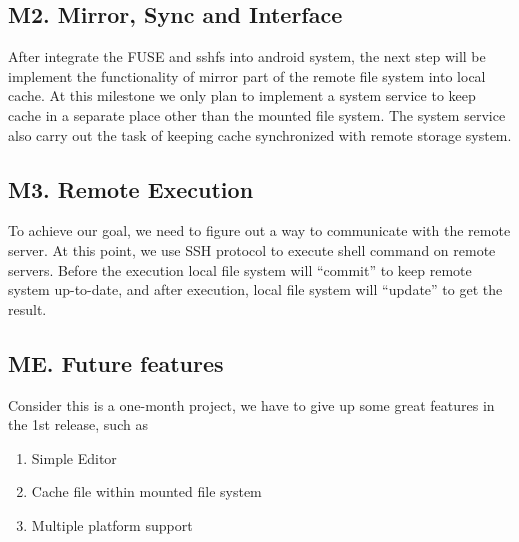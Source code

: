 \documentclass[letter,11pt] {article}
\begin{document}
\subsection*{M2. Mirror, Sync and Interface}
After integrate the FUSE and sshfs into android system, the next step will be implement the functionality of mirror part of the remote file system into local cache. At this milestone we only plan to implement a system service to keep cache in a separate place other than the mounted file system. The system service also carry out the task of keeping cache synchronized with remote storage system.

\subsection*{M3. Remote Execution}
To achieve our goal, we need to figure out a way to communicate with the remote server. At this point, we use SSH protocol to execute shell command on remote servers. Before the execution local file system will ``commit'' to keep remote system up-to-date, and after execution, local file system will ``update'' to get the result.

\subsection*{ME. Future features}
Consider this is a one-month project, we have to give up some great features in the 1st release, such as
\begin{enumerate}
\item Simple Editor
\item Cache file within mounted file system
\item Multiple platform support
\end{enumerate}
\end{document}
